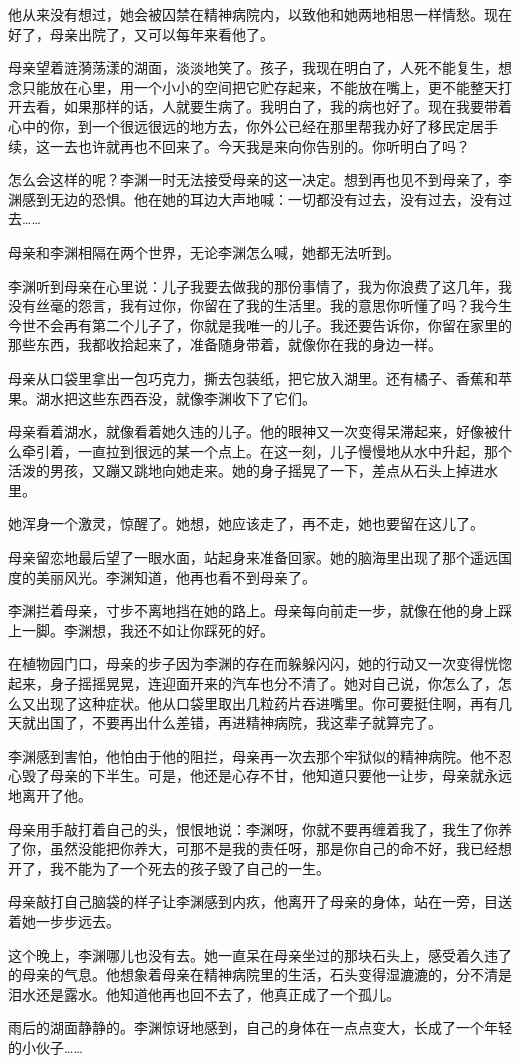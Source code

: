 \documentclass[UTF8]{ctexart}
\begin{document}
他从来没有想过，她会被囚禁在精神病院内，以致他和她两地相思一样情愁。现在好了，母亲出院了，又可以每年来看他了。

母亲望着涟漪荡漾的湖面，淡淡地笑了。孩子，我现在明白了，人死不能复生，想念只能放在心里，用一个小小的空间把它贮存起来，不能放在嘴上，更不能整天打开去看，如果那样的话，人就要生病了。我明白了，我的病也好了。现在我要带着心中的你，到一个很远很远的地方去，你外公已经在那里帮我办好了移民定居手续，这一去也许就再也不回来了。今天我是来向你告别的。你听明白了吗？

怎么会这样的呢？李渊一时无法接受母亲的这一决定。想到再也见不到母亲了，李渊感到无边的恐惧。他在她的耳边大声地喊：一切都没有过去，没有过去，没有过去\ldots\ldots{}

母亲和李渊相隔在两个世界，无论李渊怎么喊，她都无法听到。

李渊听到母亲在心里说：儿子我要去做我的那份事情了，我为你浪费了这几年，我没有丝毫的怨言，我有过你，你留在了我的生活里。我的意思你听懂了吗？我今生今世不会再有第二个儿子了，你就是我唯一的儿子。我还要告诉你，你留在家里的那些东西，我都收拾起来了，准备随身带着，就像你在我的身边一样。

母亲从口袋里拿出一包巧克力，撕去包装纸，把它放入湖里。还有橘子、香蕉和苹果。湖水把这些东西吞没，就像李渊收下了它们。

母亲看着湖水，就像看着她久违的儿子。他的眼神又一次变得呆滞起来，好像被什么牵引着，一直拉到很远的某一个点上。在这一刻，儿子慢慢地从水中升起，那个活泼的男孩，又蹦又跳地向她走来。她的身子摇晃了一下，差点从石头上掉进水里。

她浑身一个激灵，惊醒了。她想，她应该走了，再不走，她也要留在这儿了。

母亲留恋地最后望了一眼水面，站起身来准备回家。她的脑海里出现了那个遥远国度的美丽风光。李渊知道，他再也看不到母亲了。

李渊拦着母亲，寸步不离地挡在她的路上。母亲每向前走一步，就像在他的身上踩上一脚。李渊想，我还不如让你踩死的好。

在植物园门口，母亲的步子因为李渊的存在而躲躲闪闪，她的行动又一次变得恍惚起来，身子摇摇晃晃，连迎面开来的汽车也分不清了。她对自己说，你怎么了，怎么又出现了这种症状。他从口袋里取出几粒药片吞进嘴里。你可要挺住啊，再有几天就出国了，不要再出什么差错，再进精神病院，我这辈子就算完了。

李渊感到害怕，他怕由于他的阻拦，母亲再一次去那个牢狱似的精神病院。他不忍心毁了母亲的下半生。可是，他还是心存不甘，他知道只要他一让步，母亲就永远地离开了他。

母亲用手敲打着自己的头，恨恨地说：李渊呀，你就不要再缠着我了，我生了你养了你，虽然没能把你养大，可那不是我的责任呀，那是你自己的命不好，我已经想开了，我不能为了一个死去的孩子毁了自己的一生。

母亲敲打自己脑袋的样子让李渊感到内疚，他离开了母亲的身体，站在一旁，目送着她一步步远去。

这个晚上，李渊哪儿也没有去。她一直呆在母亲坐过的那块石头上，感受着久违了的母亲的气息。他想象着母亲在精神病院里的生活，石头变得湿漉漉的，分不清是泪水还是露水。他知道他再也回不去了，他真正成了一个孤儿。

雨后的湖面静静的。李渊惊讶地感到，自己的身体在一点点变大，长成了一个年轻的小伙子\ldots\ldots{}
\end{document}
